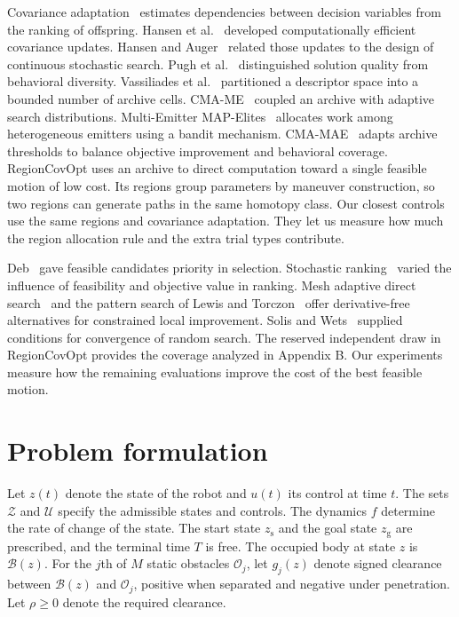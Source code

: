 \documentclass[a4paper]{cas-sc}
\begin{document}
Covariance adaptation~\cite{cma} estimates dependencies between decision variables from the ranking of offspring. Hansen et al.~\cite{cma2} developed computationally efficient covariance updates. Hansen and Auger~\cite{cma3} related those updates to the design of continuous stochastic search. Pugh et al.~\cite{quality} distinguished solution quality from behavioral diversity. Vassiliades et al.~\cite{cvt} partitioned a descriptor space into a bounded number of archive cells. CMA-ME~\cite{cmame} coupled an archive with adaptive search distributions. Multi-Emitter MAP-Elites~\cite{memap} allocates work among heterogeneous emitters using a bandit mechanism. CMA-MAE~\cite{cmamae} adapts archive thresholds to balance objective improvement and behavioral coverage. RegionCovOpt uses an archive to direct computation toward a single feasible motion of low cost. Its regions group parameters by maneuver construction, so two regions can generate paths in the same homotopy class. Our closest controls use the same regions and covariance adaptation. They let us measure how much the region allocation rule and the extra trial types contribute.

Deb~\cite{deb} gave feasible candidates priority in selection. Stochastic ranking~\cite{runar} varied the influence of feasibility and objective value in ranking. Mesh adaptive direct search~\cite{mesh} and the pattern search of Lewis and Torczon~\cite{comp} offer derivative-free alternatives for constrained local improvement. Solis and Wets~\cite{solis} supplied conditions for convergence of random search. The reserved independent draw in RegionCovOpt provides the coverage analyzed in Appendix B. Our experiments measure how the remaining evaluations improve the cost of the best feasible motion.

\section{Problem formulation}
Let $z(t)$ denote the state of the robot and $u(t)$ its control at time $t$. The sets $\mathcal Z$ and $\mathcal U$ specify the admissible states and controls. The dynamics $f$ determine the rate of change of the state. The start state $z_{\mathrm s}$ and the goal state $z_{\mathrm g}$ are prescribed, and the terminal time $T$ is free. The occupied body at state $z$ is $\mathcal B(z)$. For the $j$th of $M$ static obstacles $\mathcal O_j$, let $g_j(z)$ denote signed clearance between $\mathcal B(z)$ and $\mathcal O_j$, positive when separated and negative under penetration. Let $\rho\ge0$ denote the required clearance.
\end{document}
